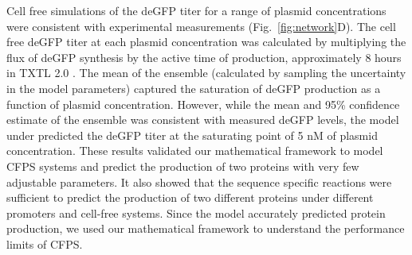 \documentclass[journal=asbcd6,manuscript=article]{achemso}
\begin{document}
Cell free simulations of the deGFP titer for a range of plasmid concentrations were consistent with experimental measurements (Fig.~\ref{fig:network}D).
The cell free deGFP titer at each plasmid concentration was calculated by multiplying the flux of deGFP synthesis by the active time of production, approximately 8 hours in TXTL 2.0 \cite{Garamella:2016aa}.
The mean of the ensemble (calculated by sampling the uncertainty in the model parameters) captured the saturation of deGFP production as a function of plasmid concentration.
However, while the mean and 95\% confidence estimate of the ensemble was consistent with measured deGFP levels, the model under predicted the deGFP titer at the saturating point of 5 nM of plasmid concentration.
These results validated our mathematical framework to model CFPS systems and predict the production of two proteins with very few adjustable parameters.
It also showed that the sequence specific reactions were sufficient to predict the production of two different proteins under different promoters and cell-free systems.
Since the model accurately predicted protein production, we used our mathematical framework to understand the performance limits of CFPS.

\end{document}
